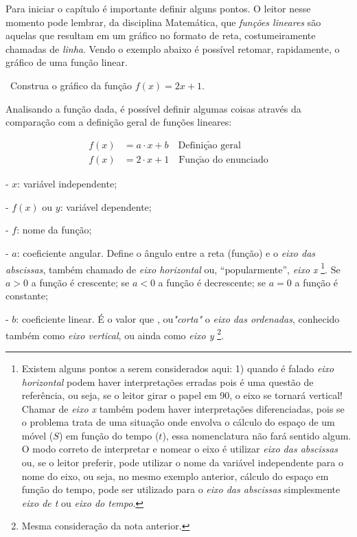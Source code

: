 Para iniciar o capítulo é importante definir alguns pontos. O leitor nesse momento pode lembrar, da disciplina Matemática, que \textit{funções lineares} são aquelas que resultam em um gráfico no formato de reta, costumeiramente chamadas de \textit{linha}. Vendo o exemplo abaixo é possível retomar, rapidamente, o gráfico de uma função linear.
\begin{example}
	\video \, Construa o gráfico da função $f(x)=2x +1$.


	Analisando a função dada, é possível definir algumas coisas através da comparação com a definição geral de funções lineares:
	
	\begin{align*}
		f(x) & =  a\cdot x+b\quad\mathrm{Defini\text{\c{c}}\tilde{a}o\,\,geral}\\
		f(x) & =  2\cdot x+1\quad\mathrm{Fun\text{\c{c}}\tilde{a}o\,\,do\,\,enunciado}
	\end{align*}
	
	- $x$: variável independente;
	
	- $f(x)$ ou $y$: variável dependente;
	
	- $f$: nome da função;
	
	- $a$: coeficiente angular. Define o ângulo entre a reta (função) e o \textit{eixo das abscissas}, também chamado de \textit{eixo horizontal} ou, ``popularmente'', \textit{eixo x} \footnote{Existem alguns pontos a serem considerados aqui: 1) quando é falado \textit{eixo horizontal} podem haver interpretações erradas pois é uma questão de referência, ou seja, se o leitor girar o papel em
		90\textdegree , o eixo se tornará vertical! Chamar de \textit{eixo x} também podem haver interpretações diferenciadas, pois se o problema trata de uma situação onde envolva o cálculo do espaço de um móvel ($S$) em função do tempo ($t$), essa nomenclatura não fará sentido algum. O modo correto de interpretar e nomear o eixo é utilizar \textit{eixo das abscissas} ou, se o leitor preferir, pode utilizar o nome da variável independente para o nome do eixo, ou seja, no mesmo exemplo anterior, cálculo do espaço em função do tempo, pode ser utilizado para o \textit{eixo das abscissas} simplesmente \textit{eixo de t} ou \textit{eixo do tempo}.}. Se $a > 0$ a função é crescente; se $a<0$ a função é decrescente; se $a=0$ a função é constante;
	
	- $b$: coeficiente linear. É o valor que , ou\textit{"corta"} o \textit{eixo das ordenadas}, conhecido também como \textit{eixo vertical}, ou ainda como \textit{eixo y} \footnote{Mesma consideração da nota anterior.}.
	

\end{example}
